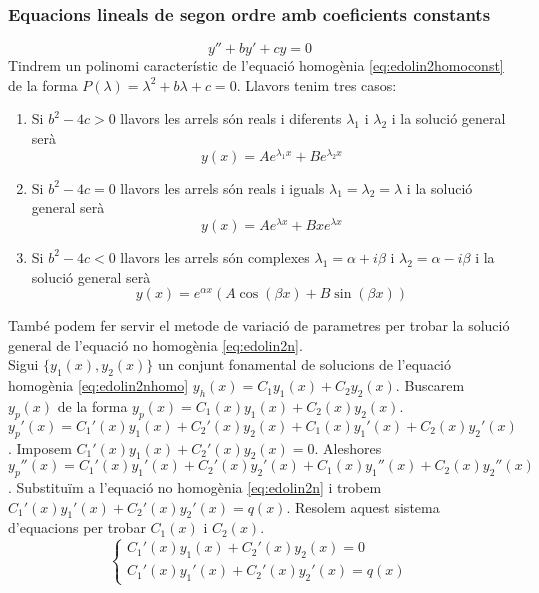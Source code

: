 \documentclass[../main.tex]{subfiles}
\begin{document}
\subsubsection{Equacions lineals de segon ordre amb coeficients constants}
\begin{equation}
	y'' + by' + cy = 0
	\label{eq:edolin2homoconst}
\end{equation}
Tindrem un polinomi característic de l'equació homogènia \eqref{eq:edolin2homoconst} de la forma $P(\lambda) = \lambda^2 + b\lambda + c = 0$. Llavors tenim tres casos:
\begin{enumerate}
	\item Si $b^2 - 4c > 0$ llavors les arrels són reals i diferents $\lambda_1$ i $\lambda_2$ i la solució general serà
		\begin{displaymath}
			y(x) = Ae^{\lambda_1x} + Be^{\lambda_2x}
		\end{displaymath}
	\item Si $b^2 - 4c = 0$ llavors les arrels són reals i iguals $\lambda_1 = \lambda_2 = \lambda$ i la solució general serà
		\begin{displaymath}
			y(x) = Ae^{\lambda x} + Bxe^{\lambda x}
		\end{displaymath}
	\item Si $b^2 - 4c < 0$ llavors les arrels són complexes $\lambda_1 = \alpha + i\beta$ i $\lambda_2 = \alpha - i\beta$ i la solució general serà
		\begin{displaymath}
			y(x) = e^{\alpha x}(A\cos(\beta x) + B\sin(\beta x))
		\end{displaymath}
\end{enumerate}

També podem fer servir el metode de variació de parametres per trobar la solució general de l'equació no homogènia \eqref{eq:edolin2n}.\\
	Sigui $\{y_1(x), y_2(x)\}$ un conjunt fonamental de solucions de l'equació homogènia \eqref{eq:edolin2nhomo} $y_h(x) = C_1 y_1(x) + C_2 y_2(x)$. Buscarem $y_p(x)$ de la forma $y_p(x) = C_1(x)y_1(x) + C_2(x)y_2(x)$. $y_p'(x) = C_1'(x)y_1(x) + C_2'(x)y_2(x) + C_1(x)y_1'(x) + C_2(x)y_2'(x)$. Imposem $C_1'(x)y_1(x) + C_2'(x)y_2(x) = 0$. Aleshores $y_p''(x) = C_1'(x)y_1'(x) + C_2'(x)y_2'(x) + C_1(x)y_1''(x) + C_2(x)y_2''(x)$. Substituïm a l'equació no homogènia \eqref{eq:edolin2n} i trobem $C_1'(x)y_1'(x) + C_2'(x)y_2'(x) = q(x)$. Resolem aquest sistema d'equacions per trobar $C_1(x)$ i $C_2(x)$.
	\begin{displaymath}
		\begin{cases}
			C_1'(x)y_1(x) + C_2'(x)y_2(x) = 0\\
			C_1'(x)y_1'(x) + C_2'(x)y_2'(x) = q(x)
		\end{cases}
	\end{displaymath}
\end{document}
